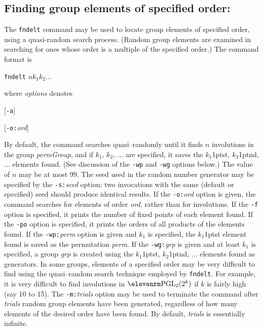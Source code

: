 \subsection{Finding group elements of specified order:}The {\tt fndelt}
command may be used to locate group elements of specified order, using
a quasi-random search process.  (Random group elements are examined in
searching for ones whose order is a multiple of the specified order.)
The command format is
%
\smallskip
\centerline{{\tt fndelt} \quad
                        $n$\quad $k_1$\quad $k_2$\quad$\ldots$}
\smallskip
where {\it options\/} denotes
\smallskip
\centerline{
        [{\tt -a}]\enskip
        [{\tt -f}]\enskip
        [{\tt -i}]\enskip
        [{\tt -m:}{\it trials}]\enskip
        [{\tt -mb:}$k$]\enskip
        [{\tt -mw:}$w$]\enskip
        [{\tt -n:}{\it name}]}
\vskip2pt
\centerline{
        [{\tt -o:}{\it ord\/}]\enskip
        [{\tt -p:}{\it path\/}]\enskip
        [{\tt -po}]\enskip
        [{\tt -s:}{\it seed\/}]\enskip
        [{\tt -wg:}{\it grp\/}]\enskip
        [{\tt -wp:}{\it perm\/}]}
\smallskip
By default, the command searches quasi--randomly
until it finds $n$ involutions in the
group {\it permGroup\/}, and
if $k_1,\,k_2,\,\ldots$ are specified, it saves the $k_1$\kern1ptst,
$k_2$\kern1ptnd, $\ldots$ elements found.  (See discussion of the 
{\tt -wp} and {\tt -wg} options below.)  The value of $n$ may be at
most 99.  The seed used in the random number generator may be specified
by the {\tt -s:}{\it seed\/} option; two invocations with the same
(default or specified) seed should produce identical results.
If the {\tt -o:}{\it ord\/}
option is given, the command searches for elements of order {\it ord}, rather
than for involutions.  If the {\tt -f} option is specified, it prints
the number of fixed points of each element found.  If the {\tt -po} option
is specified, it prints the orders of all products of the elements found.
If the {\tt -wp:}{\it perm\/} option is given and $k_1$ is specified,
the $k_1$\kern1ptst element found is saved as the permutation {\it perm}.
If the {\tt -wg:}{\it grp\/} is given and at least $k_1$ is specified,
a group {\it grp\/} is created using the $k_1$\kern1ptst,
$k_2$\kern1ptnd, $\ldots$ elements found as generators.
\medbreak
%
In some groups, elements of a specified order may be very difficult
to find using the quasi--random search technique employed by {\tt fndelt}.
For example, it is very difficult to find involutions in ${\rm PGL}_2(2^k)$
if $k$ is fairly high (say 10 to 15).  The {\tt -m:}{\it trials\/} option
may be used to terminate the command after {\it trials\/} random
group elements have been generated, regardless of how many elements of
the desired order have been found.  By default, {\it trials\/} is
essentially infinite.
\medbreak
%
%
%
